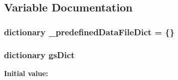 \subsection{Variable Documentation}
\hypertarget{namespacepyneb_1_1utils_1_1physics_a78612b3baa31d8b1afffc83fa7e63117}{
\subsubsection[{\-\_\-predefined\-Data\-File\-Dict}]{\setlength{\rightskip}{0pt plus 5cm}dictionary \-\_\-predefined\-Data\-File\-Dict = \{\}}}\label{namespacepyneb_1_1utils_1_1physics_a78612b3baa31d8b1afffc83fa7e63117}
\hypertarget{namespacepyneb_1_1utils_1_1physics_ab143ee5cc76a192f8c1811837c142d19}{
\subsubsection[{gs\-Dict}]{\setlength{\rightskip}{0pt plus 5cm}dictionary gs\-Dict}}\label{namespacepyneb_1_1utils_1_1physics_ab143ee5cc76a192f8c1811837c142d19}
{\bfseries Initial value\-:}
